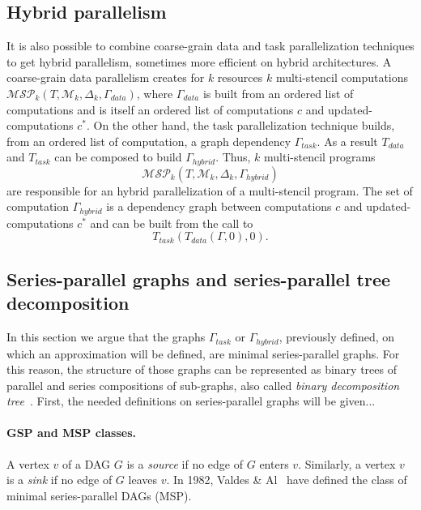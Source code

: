 \subsection{Hybrid parallelism}
It is also possible to combine coarse-grain data and task parallelization techniques to get hybrid parallelism, sometimes more efficient on hybrid architectures. A coarse-grain data parallelism creates for $k$ resources $k$ multi-stencil computations $\mathcal{MSP}_k(T,\mathcal{M}_k,\Delta_k,\Gamma_{data})$, where $\Gamma_{data}$ is built from an ordered list of computations and is itself an ordered list of computations $c$ and updated-computations $c^*$. On the other hand, the task parallelization technique builds, from an ordered list of computation, a graph dependency $\Gamma_{task}$. As a result $T_{data}$ and $T_{task}$ can be composed to build $\Gamma_{hybrid}$. Thus, $k$ multi-stencil programs
\begin{equation*}
\mathcal{MSP}_k(T,\mathcal{M}_k,\Delta_k,\Gamma_{hybrid})
\end{equation*}
are responsible for an hybrid parallelization of a multi-stencil program. The set of computation $\Gamma_{hybrid}$ is a dependency graph between computations $c$ and updated-computations $c^*$ and can be built from the call to 
\begin{equation*}
T_{task}(T_{data}(\Gamma,0),0).
\end{equation*}

\subsection{Series-parallel graphs and series-parallel tree decomposition}
In this section we argue that the graphs $\Gamma_{task}$ or $\Gamma_{hybrid}$, previously defined, on which an approximation will be defined, are minimal series-parallel graphs. For this reason, the structure of those graphs can be represented as binary trees of parallel and series compositions of sub-graphs, also called \emph{binary decomposition tree}~\cite{Valdes:1979:RSP:800135.804393}. First, the needed definitions on series-parallel graphs will be given...

\paragraph{GSP and MSP classes.} 
A vertex $v$ of a DAG $G$ is a \emph{source} if no edge of $G$ enters $v$. Similarly, a vertex $v$ is a \emph{sink} if no edge of $G$ leaves $v$. In 1982, Valdes \& Al~\cite{Valdes:1979:RSP:800135.804393} have defined the class of minimal series-parallel DAGs (MSP).

